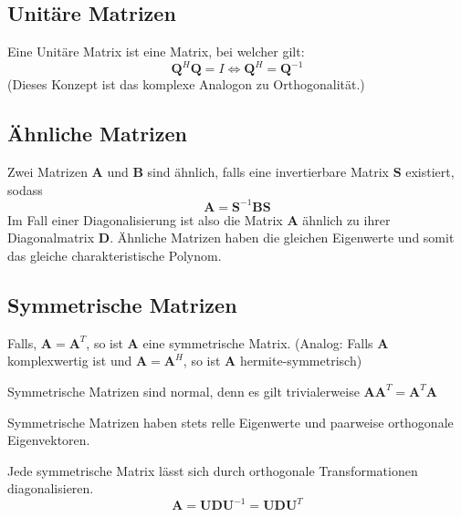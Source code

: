 \documentclass[11pt]{article}
\begin{document}
\subsection*{Unitäre Matrizen}
\vspace*{-0.5cm}
Eine Unitäre Matrix ist eine Matrix, bei welcher gilt:
$$\mathbf{Q}^H \mathbf{Q} = I \Leftrightarrow \mathbf{Q}^H = \mathbf{Q}^{-1}$$
(Dieses Konzept ist das komplexe Analogon zu Orthogonalität.)

\subsection*{Ähnliche Matrizen}
\vspace*{-0.5cm}
Zwei Matrizen $\mathbf{A}$ und $\mathbf{B}$ sind ähnlich, falls eine invertierbare Matrix $\mathbf{S}$ existiert, sodass
$$\mathbf{A} = \mathbf{S}^{-1} \mathbf{BS}$$
Im Fall einer Diagonalisierung ist also die Matrix $\mathbf{A}$ ähnlich zu ihrer Diagonalmatrix $\mathbf{D}$. Ähnliche Matrizen haben die gleichen Eigenwerte und somit das gleiche charakteristische Polynom.

\subsection*{Symmetrische Matrizen}
\vspace*{-0.5cm}
Falls, $\mathbf{A} = \mathbf{A}^T$, so ist $\mathbf{A}$ eine symmetrische Matrix. (Analog: Falls $\mathbf{A}$ komplexwertig ist und $\mathbf{A} = \mathbf{A}^H$, so ist $\mathbf{A}$ hermite-symmetrisch)

Symmetrische Matrizen sind normal, denn es gilt trivialerweise $\mathbf{AA}^T = \mathbf{A}^T \mathbf{A}$

Symmetrische Matrizen haben stets relle Eigenwerte und paarweise orthogonale Eigenvektoren.

Jede symmetrische Matrix lässt sich durch orthogonale Transformationen diagonalisieren.
$$\mathbf{A} = \mathbf{UDU}^{-1} = \mathbf{UDU}^T$$
\end{document}
